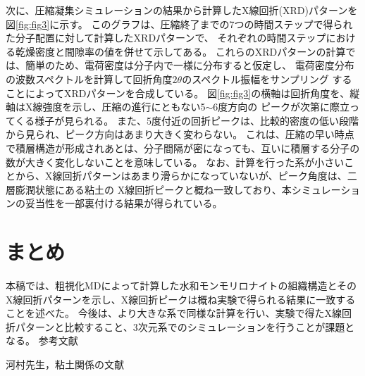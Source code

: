 ﻿\documentclass[11pt,a4j]{jarticle}
\begin{document}
次に、圧縮凝集シミュレーションの結果から計算したX線回折(XRD)パターンを図\ref{fig:fig3}に示す。
このグラフは、圧縮終了までの7つの時間ステップで得られた分子配置に対して計算したXRDパターンで、
それぞれの時間ステップにおける乾燥密度と間隙率の値を併せて示してある。
これらのXRDパターンの計算では、簡単のため、電荷密度は分子内で一様に分布すると仮定し、
電荷密度分布の波数スペクトルを計算して回折角度$2\theta$のスペクトル振幅をサンプリング
することによってXRDパターンを合成している。
図\ref{fig:fig3}の横軸は回折角度を、縦軸はX線強度を示し、圧縮の進行にともない5$\sim$6度方向の
ピークが次第に際立ってくる様子が見られる。
また、5度付近の回折ピークは、比較的密度の低い段階から見られ、ピーク方向はあまり大きく変わらない。
これは、圧縮の早い時点で積層構造が形成されあとは、分子間隔が密になっても、互いに積層する分子の数が大きく変化しないことを意味している。
なお、計算を行った系が小さいことから、X線回折パターンはあまり滑らかになっていないが、ピーク角度は、二層膨潤状態にある粘土の
X線回折ピークと概ね一致しており、本シミュレーションの妥当性を一部裏付ける結果が得られている。
\section{まとめ}
本稿では、粗視化MDによって計算した水和モンモリロナイトの組織構造とそのX線回折パターンを示し、X線回折ピークは概ね実験で得られる結果に一致することを述べた。
今後は、より大きな系で同様な計算を行い、実験で得たX線回折パターンと比較すること、3次元系でのシミュレーションを行うことが課題となる。
参考文献
\begin{thebibliography}{99}
	河村先生，粘土関係の文献
\end{thebibliography}
\end{document}
